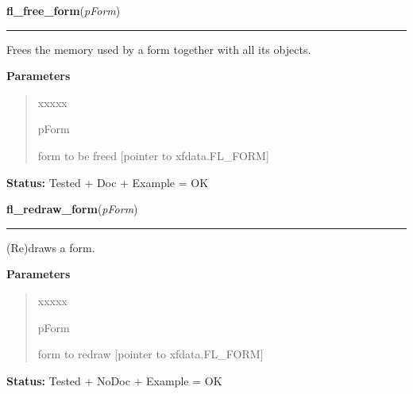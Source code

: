 \hspace{.8\funcindent}\begin{boxedminipage}{\funcwidth}

    \raggedright \textbf{fl\_free\_form}(\textit{pForm})

    \vspace{-1.5ex}

    \rule{\textwidth}{0.5\fboxrule}
\setlength{\parskip}{2ex}
    Frees the memory used by a form together with all its objects.

\setlength{\parskip}{1ex}
      \textbf{Parameters}
      \vspace{-1ex}

      \begin{quote}
        \begin{Ventry}{xxxxx}

          \item[pForm]

          form to be freed [pointer to xfdata.FL\_FORM]

        \end{Ventry}

      \end{quote}

\textbf{Status:} Tested + Doc + Example = OK



    \end{boxedminipage}

    \label{xformslib:library:fl_redraw_form}

    \vspace{0.5ex}

\hspace{.8\funcindent}\begin{boxedminipage}{\funcwidth}

    \raggedright \textbf{fl\_redraw\_form}(\textit{pForm})

    \vspace{-1.5ex}

    \rule{\textwidth}{0.5\fboxrule}
\setlength{\parskip}{2ex}
    (Re)draws a form.

\setlength{\parskip}{1ex}
      \textbf{Parameters}
      \vspace{-1ex}

      \begin{quote}
        \begin{Ventry}{xxxxx}

          \item[pForm]

          form to redraw [pointer to xfdata.FL\_FORM]

        \end{Ventry}

      \end{quote}

\textbf{Status:} Tested + NoDoc + Example = OK



    \end{boxedminipage}

